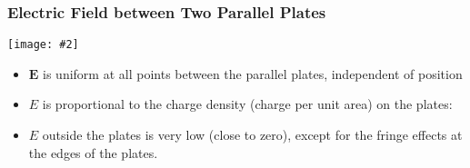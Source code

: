 \documentclass[12pt,aspectratio=169]{beamer}
\newcommand{\pic}[2]{\texttt{[image: \#2]}}
\newcommand{\mb}[1]{\mathbf{#1}}
\begin{document}
%
%

\begin{frame}
  \frametitle{Electric Field between Two Parallel Plates}
  \begin{center}
    \pic{.6}{elfield-600x205.jpg}
  \end{center}
  
  \vspace{-.2in}
  \begin{itemize}
  \item $\mb{E}$ is uniform at all points between the
    parallel plates, independent of position
  \item $E$ is proportional to the charge density (charge per unit
    area) on the plates:

  \item $E$ outside the plates is very low (close to zero), except for
    the fringe effects at the edges of the plates. 
  \end{itemize}
\end{frame}
\end{document}

